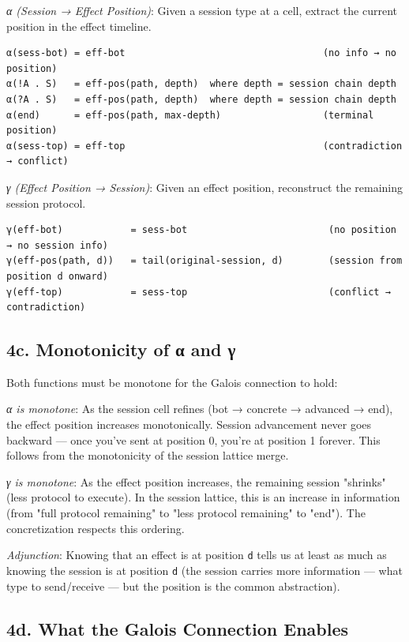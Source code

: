 \documentclass[11pt]{article}
\begin{document}
\emph{α (Session → Effect Position)}: Given a session type at a cell, extract the
current position in the effect timeline.

\begin{verbatim}
α(sess-bot) = eff-bot                                   (no info → no position)
α(!A . S)   = eff-pos(path, depth)  where depth = session chain depth
α(?A . S)   = eff-pos(path, depth)  where depth = session chain depth
α(end)      = eff-pos(path, max-depth)                  (terminal position)
α(sess-top) = eff-top                                   (contradiction → conflict)
\end{verbatim}

\emph{γ (Effect Position → Session)}: Given an effect position, reconstruct the
remaining session protocol.

\begin{verbatim}
γ(eff-bot)            = sess-bot                         (no position → no session info)
γ(eff-pos(path, d))   = tail(original-session, d)        (session from position d onward)
γ(eff-top)            = sess-top                         (conflict → contradiction)
\end{verbatim}
\subsection{4c. Monotonicity of α and γ}
\label{sec:orgfa752f5}

Both functions must be monotone for the Galois connection to hold:

\emph{α is monotone}: As the session cell refines (bot → concrete → advanced → end),
the effect position increases monotonically. Session advancement never goes
backward — once you've sent at position 0, you're at position 1 forever.
This follows from the monotonicity of the session lattice merge.

\emph{γ is monotone}: As the effect position increases, the remaining session
"shrinks" (less protocol to execute). In the session lattice, this is an
increase in information (from "full protocol remaining" to "less protocol
remaining" to "end"). The concretization respects this ordering.

\emph{Adjunction}: Knowing that an effect is at position \texttt{d} tells us at least as
much as knowing the session is at position \texttt{d} (the session carries more
information — what type to send/receive — but the position is the common
abstraction).
\subsection{4d. What the Galois Connection Enables}
\label{sec:orga8f510c}
\end{document}
